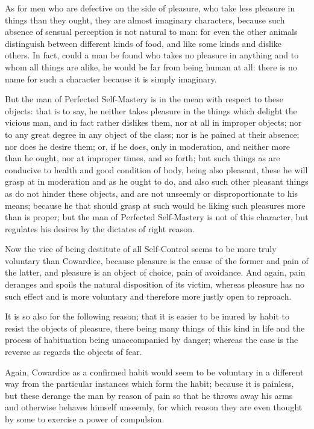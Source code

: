 As for men who are defective on the side of pleasure, who take less pleasure in
things than they ought, they are almost imaginary characters, because such
absence of sensual perception is not natural to man: for even the other animals
distinguish between different kinds of food, and like some kinds and dislike
others. In fact, could a man be found who takes no pleasure in anything and to
whom all things are alike, he would be far from being human at all: there is no
name for such a character because it is simply imaginary.

But the man of Perfected Self-Mastery is in the mean with respect to these
objects: that is to say, he neither takes pleasure in the things which delight
the vicious man, and in fact rather dislikes them, nor at all in improper
objects; nor to any great degree in any object of the class; nor is he pained
at their absence; nor does he desire them; or, if he does, only in moderation,
and neither more than he ought, nor at improper times, and so forth; but such
things as are conducive to health and good condition of body, being also
pleasant, these he will grasp at in moderation and as he ought to do, and also
such other pleasant things as do not hinder these objects, and are not unseemly
or disproportionate to his means; because he that should grasp at such would be
liking such pleasures more than is proper; but the man of Perfected
Self-Mastery is not of this character, but regulates his desires by the
dictates of right reason.


Now the vice of being destitute of all Self-Control seems to be more truly
voluntary than Cowardice, because pleasure is the cause of the former and pain
of the latter, and pleasure is an object of choice, pain of avoidance. And
again, pain deranges and spoils the natural disposition of its victim, whereas
pleasure has no such effect and is more voluntary and therefore more justly
open to reproach.

It is so also for the following reason; that it is easier to be inured by habit
to resist the objects of pleasure, there being many things of this kind in life
and the process of habituation being unaccompanied by danger; whereas the case
is the reverse as regards the objects of fear.

Again, Cowardice as a confirmed habit would seem to be voluntary in a different
way from the particular instances which form the habit; because it is painless,
but these derange the man by reason of pain so that he throws away his arms and
otherwise behaves himself unseemly, for which reason they are even thought by
some to exercise a power of compulsion.

